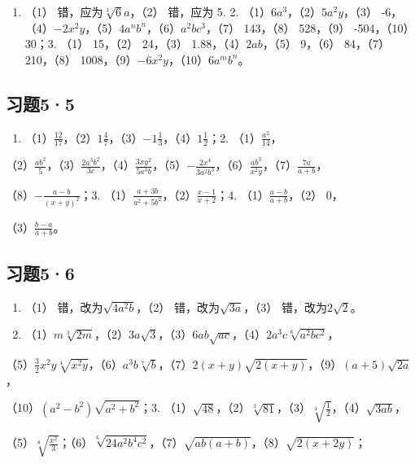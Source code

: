 \begin{enumerate}
\item
  （1） 错，应为\(\sqrt[3]{6} a\)，（2） 错，应为 5. 2.
  （1）\(6a^3\)，（2）\(5a^2y\)，（3）
  -6，（4）\(-2x^2y\)，（5）\(4a^n b^n\)，（6）\(a^2bc^3\)，（7）
  143，（8） 528，（9） -504，（10） 30；3. （1） 15，（2） 24，（3）
  1.88，（4）\(2ab\)，（5） 9，（6） 84，（7） 210，（8）
  1008，（9）\(-6x^2y\)，（10）\(6a^m b^n\)。
\end{enumerate}

\subsection{习题5·5}

\begin{enumerate}
\item
  （1）\(\frac{12}{17}\)，（2）\(1\frac{4}{7}\)，（3）\(-1\frac{1}{3}\)，（4）\(1\frac{1}{2}\)；2.
  （1）\(\frac{a^2}{14}\)，
\end{enumerate}

（2）\(\frac{ab^2}{5}\)，（3）\(\frac{2a^3b^2}{3c}\)，（4）\(\frac{3xy^2}{5a^3b}\)，（5）\(-\frac{2x^4}{3a^2b^3}\)，（6）\(\frac{ab^3}{x^2y}\)，（7）\(\frac{7a}{a + b}\)，

（8）\(-\frac{a - b}{(x + y)^2}\)；3.
（1）\(\frac{a + 3b}{a^2 + 5b^2}\)，（2）\(\frac{x - 1}{x + 2}\)；4.
（1）\(\frac{a - b}{a + b}\)，（2） 0，

（3）\(\frac{b - a}{a + b}\)。

\subsection{习题5·6}

\begin{enumerate}
\item
  （1） 错，改为\(\sqrt{4a^2b}\)，（2） 错，改为\(\sqrt{3a}\)，（3）
  错，改为\(2\sqrt{2}\)。
\item
  （1）\(m\sqrt[3]{2m}\)，（2）\(3a\sqrt{3}\)，（3）\(6ab\sqrt{ac}\)，（4）\(2a^{3}c\sqrt[6]{a^{2}bc^{2}}\)，
\end{enumerate}

（5）\(\frac{3}{2} x^{2}y\sqrt[4]{x^{2}y}\)，（6）\(a^{3}b\sqrt[7]{b}\)，（7）\(2(x + y)\sqrt{2(x + y)}\)，（9）\((a + 5)\sqrt{2a}\)，

（10）\((a^2 - b^2)\sqrt{a^2 + b^2}\)；3.
（1）\(\sqrt{48}\)，（2）\(\sqrt[3]{81}\)，（3）\(\sqrt[4]{\frac{1}{2}}\)，（4）\(\sqrt{3ab}\)，

（5）\(\sqrt[8]{\frac{x^2}{3}}\)；（6）\(\sqrt[6]{24a^2b^4c^2}\)，（7）\(\sqrt{ab(a + b)}\)，（8）\(\sqrt{2(x + 2y)}\)；

